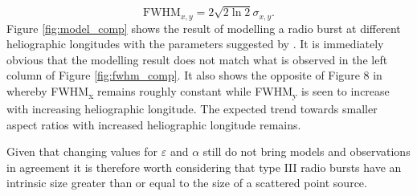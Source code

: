 \begin{equation}
\label{eq:FWHM}
\mbox{FWHM}_{x,y} = 2\sqrt{2\ln2}\sigma_{x,y}.
\end{equation}
Figure \ref{fig:model_comp} shows the result of modelling a radio burst at different heliographic longitudes with the parameters suggested by \cite{Zhang2021}. It is immediately obvious that the modelling result does not match what is observed in the left column of Figure \ref{fig:fwhm_comp}. It also shows the opposite of Figure 8 in \cite{Kontar2019} whereby FWHM\textsubscript{x} remains roughly constant while FWHM\textsubscript{y} is seen to increase with increasing heliographic longitude. The expected trend towards smaller aspect ratios with increased heliographic longitude remains.

Given that changing values for $\varepsilon$ and $\alpha$ still do not bring models and observations in agreement it is therefore worth considering that type III radio bursts have an intrinsic size greater than or equal to the size of a scattered point source.





